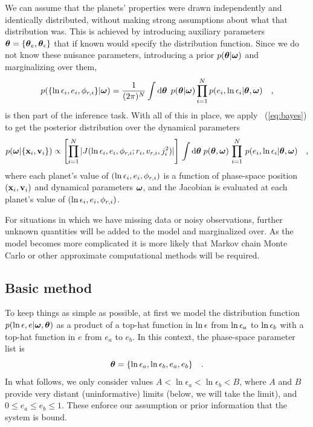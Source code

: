 We can assume that the planets' properties were drawn independently
and identically distributed, without making strong assumptions about
what that distribution was. This is achieved by introducing auxiliary
parameters $\boldsymbol{{\theta}} = \{\boldsymbol{{\theta}}_e, \boldsymbol{{\theta}}_{\epsilon}\}$ that if known
would specify the distribution function. Since we do not know these
nuisance parameters, introducing a prior $p(\boldsymbol{{\theta}}|\boldsymbol{{\omega}})$ and
marginalizing over them,
\begin{equation}
    p(\{\ln{\epsilon}_i, e_i, \phi_{r,i}\}|\boldsymbol{{\omega}}) = \frac{1}{(2\pi)^N}
    \int \mathrm{d}\boldsymbol{{\theta}} \;\, p(\boldsymbol{{\theta}}|\boldsymbol{{\omega}}) \prod_{i=1}^N p(e_i,\ln{\epsilon}_i|\boldsymbol{{\theta}},\boldsymbol{{\omega}})\quad,
\end{equation}
is then part of the inference task. With all of this in place, we
apply \eqnname~(\ref{eq:bayes}) to get the posterior distribution
over the dynamical parameters
\begin{equation}
p(\boldsymbol{{\omega}} | \{\boldsymbol{\mathbf{x}}_i,\boldsymbol{\mathbf{v}}_i\}) \propto 
  \left[\prod_{i=1}^N |J(\ln{\epsilon}_i,e_i,\phi_{r,i};r_i,v_{r,i},j_i^2)|\right] \,
  \int\mathrm{d}\boldsymbol{{\theta}}\;p(\boldsymbol{{\theta}},\boldsymbol{{\omega}})
  \,\prod_{i=1}^N
  \,p(e_i,\ln{\epsilon}_i|\boldsymbol{{\theta}},\boldsymbol{{\omega}})\quad ,
  \label{eqn:posterior}
\end{equation}
where each planet's value of $(\ln{\epsilon}_i,e_i,\phi_{r,i})$ is a
function of phase-space position $(\boldsymbol{\mathbf{x}}_i,\boldsymbol{\mathbf{v}}_i)$ and dynamical
parameters $\boldsymbol{{\omega}}$, and the Jacobian is evaluated at each planet's
value of $(\ln{\epsilon}_i,e_i,\phi_{r,i})$.

For situations in which we have missing data or noisy observations,
further unknown quantities will be added to the model and marginalized
over. As the model becomes more complicated it is more likely that
Markov chain Monte Carlo \citep[\eg,][]{neal1993} or other approximate
computational methods will be required.

\subsection{Basic method}

To keep things as simple as possible, at first we model the
distribution function $p(\ln{\epsilon}, e|\boldsymbol{{\omega}},\boldsymbol{{\theta}})$ as a
product of a top-hat function in $\ln{\epsilon}$ from $\ln{\epsilon}_a$ to
$\ln{\epsilon}_b$ with a top-hat function in $e$ from $e_a$ to $e_b$. In
this context, the phase-space parameter list is
\begin{equation}
\boldsymbol{{\theta}} = \{ \ln{\epsilon}_a, \ln{\epsilon}_b, e_a, e_b \} \quad.
\end{equation}
In what follows, we only consider values $A <\ln \epsilon_a < \ln
\epsilon_b < B$, where $A$ and $B$ provide very distant
(uninformative) limits (below, we will take the limit), and $0 \leq
e_a \leq e_b \leq 1$. These enforce our assumption or prior
information that the system is bound.

